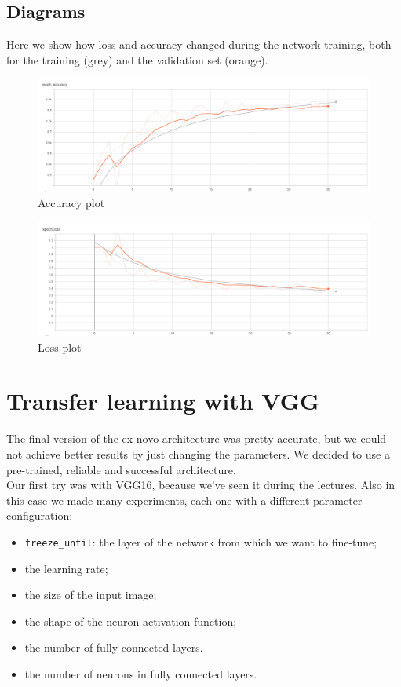 \documentclass[12pt,a4paper]{report}
\begin{document}
		\subsection{Diagrams}
Here we show how loss and accuracy changed during the network training, both for the training (grey) and the validation set (orange).
		\begin{figure}[H]
			\includegraphics[scale = 0.5, center]{ex-Novo accuracy}
			\caption{Accuracy plot}
		\end{figure}
		\begin{figure}[H]
		\includegraphics[scale = 0.5, center]{ex-Novo loss}
		\caption{Loss plot}
		\end{figure}
		
		\section{Transfer learning with VGG}
	The final version of the ex-novo architecture was pretty accurate, but we could not achieve better results by just changing the parameters. We decided to use a pre-trained, reliable and successful architecture.\\
	Our first try was with VGG16, because we've seen it during the lectures. Also in this case we made many experiments, each one with a different parameter configuration:
	\begin{itemize}
		\item \texttt{freeze\_until}: the layer of the network from which we want to fine-tune;
		\item the learning rate;
		\item the size of the input image;
		\item the shape of the neuron activation function;	
		\item the number of fully connected layers.
		\item the number of neurons in fully connected layers.
	\end{itemize}
\end{document}
